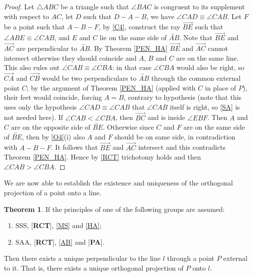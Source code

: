 \documentclass[11pt,a4paper]{article}
\theoremstyle{definition}
\newtheorem{thm}{Theorem}[section]
\theoremstyle{remark}
\numberwithin{equation}{section}
\begin{document}
\begin{proof}
Let $\triangle ABC$ be a triangle such that $\angle BAC$ is congruent to its supplement with respect to $AC$, let $D$ such that $D-A-B$, we have $\angle CAD\equiv\angle CAB$.
Let $F$ be a point such that $A-B-F$, by \ref{C4}, construct the ray $\overrightarrow{BE}$ such that $\angle ABE\equiv\angle CAB$, and $E$ and $C$ lie on the same side of $\overleftrightarrow{AB}$. Note that $\overrightarrow{BE}$ and $\overrightarrow{AC}$ are perpendicular to $\overleftrightarrow{AB}$.  By Theorem \ref{PEN_HA} $\overrightarrow{BE}$ and $\overrightarrow{AC}$ cannot intersect otherwise they should coincide and $A$, $B$ and $C$ are on the same line. This also rules out $\angle CAB\equiv \angle CBA$: in that case $\angle CBA$ would also be right, so $\overrightarrow{CA}$ and $\overrightarrow{CB}$ would be two perpendiculars to $\overleftrightarrow{AB}$ through the common external point $C$; by the argument of Theorem \ref{PEN_HA} (applied with $C$ in place of $P$), their feet would coincide, forcing $A=B$, contrary to hypothesis (note that this uses only the hypothesis $\angle CAD\equiv\angle CAB$ that $\angle CAB$ itself is right, so \ref{SA} is not needed here).
If $\angle CAB< \angle CBA$, then $\overrightarrow{BC}$  and is inside $\angle EBF$. Then $A$ and $C$ are on the opposite side of $\overleftrightarrow{BE}$. Otherwise since $C$ and $F$ are on the same side of $\overleftrightarrow{BE}$, then by \ref{O4}(i) also $A$ and $F$ should be on same side, in contradiction with $A-B-F$. It follows that $\overrightarrow{BE}$ and $\overrightarrow{AC}$ intersect and this contradicts Theorem \ref{PEN_HA}. Hence by \ref{RCT} trichotomy holds and then  $\angle CAB>\angle CBA$.
\end{proof}
We are now able to establish the existence and uniqueness of the orthogonal projection of a point onto a line.
\begin{thm}\label{PEN_LLL_PO}
If the principles of one of the following groups are assumed:
\begin{enumerate}[label=(\roman*)]
\item SSS, [\textbf{RCT}], \ref{MS} and \ref{HA};
\item SAA, [\textbf{RCT}], \ref{AB} and [\textbf{PA}].
\end{enumerate}
Then there exists a unique perpendicular to the line $l$ through a point $P$ external to it. That is, there exists a unique orthogonal projection of $P$ onto $l$.
\end{thm}
\end{document}
